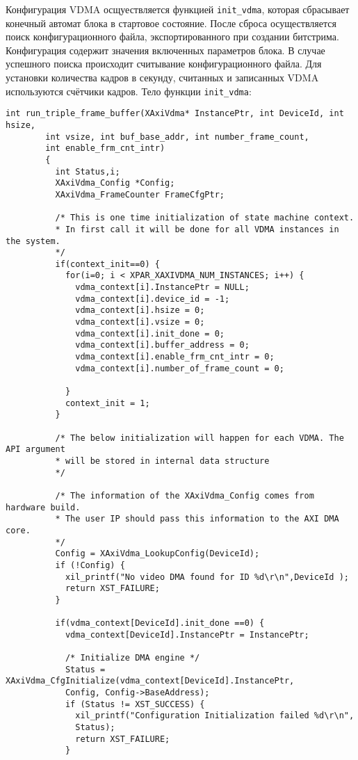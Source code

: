 Конфигурация VDMA осщуествляется функцией \texttt{init\_vdma},
которая сбрасывает конечный автомат блока в стартовое состояние. После сброса
осуществляется поиск конфигурационного файла, экспортированного при создании битстрима.
Конфигурация содержит значения включенных параметров блока. В случае успешного поиска
происходит считывание конфигурационного файла. Для установки количества кадров в секунду,
считанных и записанных VDMA используются счётчики кадров. Тело функции \texttt{init\_vdma}:
\medskip
\begin{lstlisting}[style=C]
  int run_triple_frame_buffer(XAxiVdma* InstancePtr, int DeviceId, int hsize,
		int vsize, int buf_base_addr, int number_frame_count,
		int enable_frm_cnt_intr)
        {
          int Status,i;
          XAxiVdma_Config *Config;
          XAxiVdma_FrameCounter FrameCfgPtr;

          /* This is one time initialization of state machine context.
          * In first call it will be done for all VDMA instances in the system.
          */
          if(context_init==0) {
            for(i=0; i < XPAR_XAXIVDMA_NUM_INSTANCES; i++) {
              vdma_context[i].InstancePtr = NULL;
              vdma_context[i].device_id = -1;
              vdma_context[i].hsize = 0;
              vdma_context[i].vsize = 0;
              vdma_context[i].init_done = 0;
              vdma_context[i].buffer_address = 0;
              vdma_context[i].enable_frm_cnt_intr = 0;
              vdma_context[i].number_of_frame_count = 0;

            }
            context_init = 1;
          }

          /* The below initialization will happen for each VDMA. The API argument
          * will be stored in internal data structure
          */

          /* The information of the XAxiVdma_Config comes from hardware build.
          * The user IP should pass this information to the AXI DMA core.
          */
          Config = XAxiVdma_LookupConfig(DeviceId);
          if (!Config) {
            xil_printf("No video DMA found for ID %d\r\n",DeviceId );
            return XST_FAILURE;
          }

          if(vdma_context[DeviceId].init_done ==0) {
            vdma_context[DeviceId].InstancePtr = InstancePtr;

            /* Initialize DMA engine */
            Status = XAxiVdma_CfgInitialize(vdma_context[DeviceId].InstancePtr,
            Config, Config->BaseAddress);
            if (Status != XST_SUCCESS) {
              xil_printf("Configuration Initialization failed %d\r\n",
              Status);
              return XST_FAILURE;
            }


\end{lstlisting}
